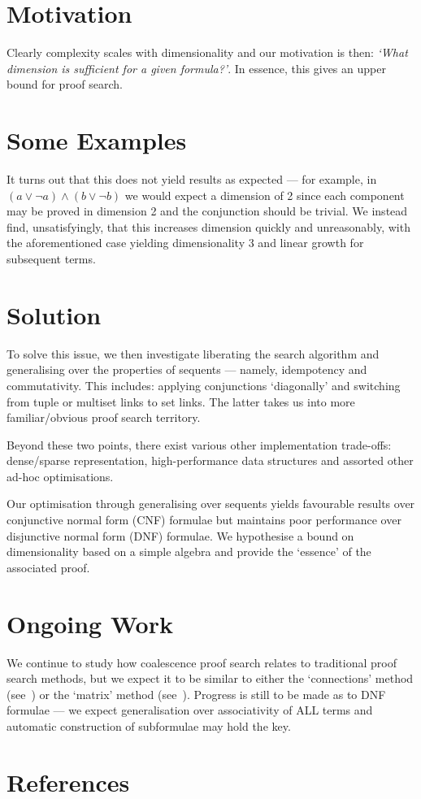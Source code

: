 \documentclass{article}
\theoremstyle{indented}
\begin{document}
    \section*{Motivation}
        Clearly complexity scales with dimensionality and our motivation is then: \textit{`What dimension is sufficient for a given formula?'}.
        In essence, this gives an upper bound for proof search.

    \section*{Some Examples}
        It turns out that this does not yield results as expected --- for example, in $(a \vee \neg a) \wedge (b \vee \neg b)$ we would expect a dimension of 2 since each component may be proved in dimension 2 and the conjunction should be trivial.
        We instead find, unsatisfyingly, that this increases dimension quickly and unreasonably, with the aforementioned case yielding dimensionality 3 and linear growth for subsequent terms.

    \section*{Solution}
        To solve this issue, we then investigate liberating the search algorithm and generalising over the properties of sequents --- namely, idempotency and commutativity.
        This includes: applying conjunctions `diagonally' and switching from tuple or multiset links to set links.
        The latter takes us into more familiar/obvious proof search territory.
        
        Beyond these two points, there exist various other implementation trade-offs: dense/sparse representation, high-performance data structures and assorted other ad-hoc optimisations.
        
        Our optimisation through generalising over sequents yields favourable results over conjunctive normal form (CNF) formulae but maintains poor performance over disjunctive normal form (DNF) formulae.
        We hypothesise a bound on dimensionality based on a simple algebra and provide the `essence' of the associated proof.

    \section*{Ongoing Work}
        We continue to study how coalescence proof search relates to traditional proof search methods, but we expect it to be similar to either the `connections' method (see~\cite{connection-based-proof-method}) or the `matrix' method (see~\cite{tableaux-for-logic-of-proofs}).
        Progress is still to be made as to DNF formulae --- we expect generalisation over associativity of ALL terms and automatic construction of subformulae may hold the key.

    \section*{References}
        
\end{document}
